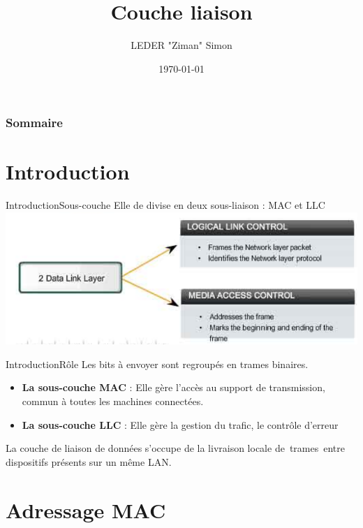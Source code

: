 \documentclass{beamer}
\title{Couche liaison}
\author{LEDER "Ziman" Simon}
\institute{Rezoleo\\}
\date{\today}
\begin{document}
	
	\begin{frame}
		\titlepage
	\end{frame}
	
	\begin{frame}
		\frametitle{Sommaire}
			\tableofcontents
	\end{frame}
	
\section{Introduction}

	\begin{frame}{Introduction}{Sous-couche}
		Elle de divise en deux sous-liaison : MAC et LLC \\
		\includegraphics[scale=0.4]{macllc.png}
	\end{frame}

	\begin{frame}{Introduction}{Rôle}
		Les bits à envoyer sont regroupés en trames binaires.\\

		\begin{itemize}
			\item [\textbullet] \textbf{La sous-couche MAC} : Elle gère l'accès au support de transmission, commun à toutes les machines connectées.
			\item [\textbullet] \textbf{La sous-couche LLC} : Elle gère la gestion du trafic, le contrôle d'erreur \\
		\end{itemize}

		La couche de liaison de données s'occupe de la livraison locale de trames entre dispositifs présents sur un même LAN.

	\end{frame}

\section{Adressage MAC}
\end{document}

